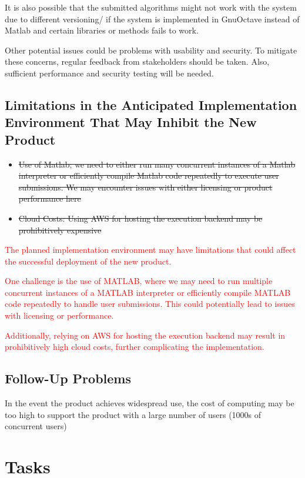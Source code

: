 \documentclass[12pt]{article}
\begin{document}
It is also possible that the submitted algorithms might not work with the system due to different versioning/ if the system is implemented in GnuOctave instead of Matlab and certain libraries or methods fails to work. 

Other potential issues could be problems with usability and security. To mitigate these concerns, regular feedback from stakeholders should be taken. Also, sufficient performance and security testing will be needed.

\subsection{Limitations in the Anticipated Implementation Environment That May
Inhibit the New Product}
\begin{itemize}
    \item \sout{Use of Matlab; we need to either run many concurrent instances of a Matlab interpreter or efficiently compile Matlab code repeatedly to execute user submissions. We may encounter issues with either licensing or product performance here}
    \item \sout{Cloud Costs: Using AWS for hosting the execution backend may be prohibitively expensive}
\end{itemize}
\textcolor{red}{The planned implementation environment may have limitations that could affect the successful deployment of the new product.}

\textcolor{red}{One challenge is the use of MATLAB, where we may need to run multiple concurrent instances of a MATLAB interpreter or efficiently compile MATLAB code repeatedly to handle user submissions. This could potentially lead to issues with licensing or performance. }

\textcolor{red}{Additionally, relying on AWS for hosting the execution backend may result in prohibitively high cloud costs, further complicating the implementation.}
\subsection{Follow-Up Problems}
In the event the product achieves widespread use, the cost of computing may be too high to support the product with a large number of users (1000s of concurrent users)

\section{Tasks}
\end{document}
